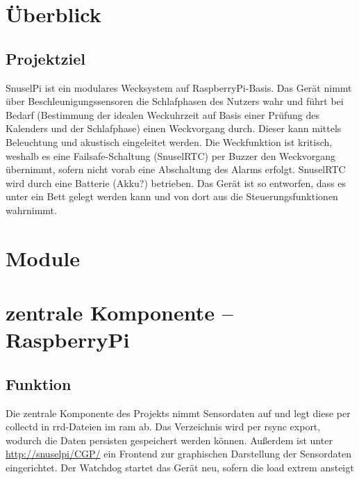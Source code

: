 \documentclass[a4paper,twoside,titlepage,normalheadings,tocleft,bibtotoc]{scrartcl}
\begin{document}
%
\tableofcontents
\newpage

\section{Überblick}
\subsection{Projektziel}
SnuselPi ist ein modulares Wecksystem auf RaspberryPi-Basis. Das Gerät nimmt über Beschleunigungssensoren die Schlafphasen des Nutzers wahr und führt bei Bedarf (Bestimmung der idealen Weckuhrzeit auf Basis einer Prüfung des Kalenders und der Schlafphase) einen Weckvorgang durch. Dieser kann mittels Beleuchtung und akustisch eingeleitet werden. Die Weckfunktion ist kritisch, weshalb es eine Failsafe-Schaltung (SnuselRTC) per Buzzer den Weckvorgang übernimmt, sofern nicht vorab eine Abschaltung des Alarms erfolgt. SnuselRTC wird durch eine Batterie (Akku?) betrieben.
Das Gerät ist so entworfen, dass es unter ein Bett gelegt werden kann und von dort aus die Steuerungsfunktionen wahrnimmt.
\section{Module}
\section{zentrale Komponente -- RaspberryPi}
\subsection{Funktion}
Die zentrale Komponente des Projekts nimmt Sensordaten auf und legt diese per collectd in rrd-Dateien im ram ab. Das Verzeichnis wird per rsync export, wodurch die Daten persisten gespeichert werden können. Außerdem ist unter \url{http://snuselpi/CGP/} ein Frontend zur graphischen Darstellung der Sensordaten eingerichtet. Der Watchdog startet das Gerät neu, sofern die load extrem ansteigt
\end{document}
